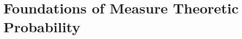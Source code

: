 \documentclass[12pt]{article}
\theoremstyle{plain}
\theoremstyle{definition}
\newtheorem{defn}[thm]{Definition}
\theoremstyle{remark}
\begin{document}







\clearpage
\section{Foundations of Measure Theoretic Probability}
\end{document}
